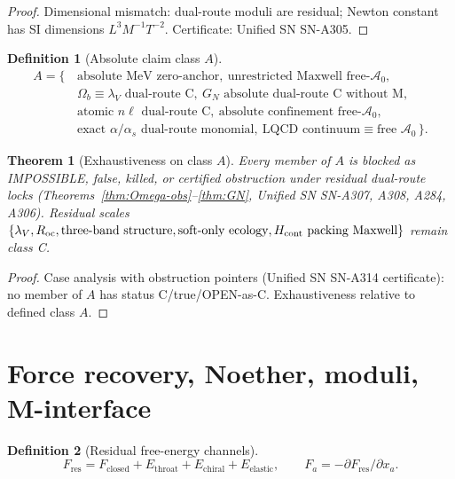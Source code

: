 \documentclass[11pt,a4paper]{article}
\newtheorem{theorem}{Theorem}
\newtheorem{definition}{Definition}
\theoremstyle{remark}
\begin{document}
\begin{proof}
Dimensional mismatch: dual-route moduli are residual; Newton constant has SI dimensions $L^3 M^{-1}T^{-2}$. Certificate: Unified SN SN-A305.
\end{proof}

\begin{definition}[Absolute claim class $A$]
\label{def:A}
\begin{equation*}
\begin{aligned}
A=\{\,&\text{absolute MeV zero-anchor},\ 
\text{unrestricted Maxwell free-}\mathcal{A}_0,\\
&\Omega_b\equiv\lambda_V\text{ dual-route C},\ 
G_N\text{ absolute dual-route C without M},\\
&\text{atomic }n\ell\text{ dual-route C},\ 
\text{absolute confinement free-}\mathcal{A}_0,\\
&\text{exact }\alpha/\alpha_s\text{ dual-route monomial},\ 
\text{LQCD continuum}\equiv\text{free }\mathcal{A}_0\,\}.
\end{aligned}
\end{equation*}
\end{definition}

\begin{theorem}[Exhaustiveness on class $A$]
\label{thm:A-exh}
Every member of $A$ is blocked as IMPOSSIBLE, false, killed, or certified obstruction under residual dual-route locks (Theorems~\ref{thm:Omega-obs}--\ref{thm:GN}, Unified SN SN-A307, A308, A284, A306). Residual scales $\{\lambda_V,R_{\mathrm{oc}},\text{three-band structure},\text{soft-only ecology},H_{\rm cont}\text{ packing Maxwell}\}$ remain class C.
\end{theorem}

\begin{proof}
Case analysis with obstruction pointers (Unified SN SN-A314 certificate): no member of $A$ has status C/true/OPEN-as-C. Exhaustiveness relative to defined class $A$.
\end{proof}

\section{Force recovery, Noether, moduli, M-interface}
\label{sec:force-moduli}

\begin{definition}[Residual free-energy channels]
\label{def:channels}
\begin{equation}
F_{\mathrm{res}}=F_{\mathrm{closed}}+E_{\mathrm{throat}}+E_{\mathrm{chiral}}+E_{\mathrm{elastic}},
\qquad
F_a=-\partial F_{\mathrm{res}}/\partial x_a.
\end{equation}
\end{definition}
\end{document}
